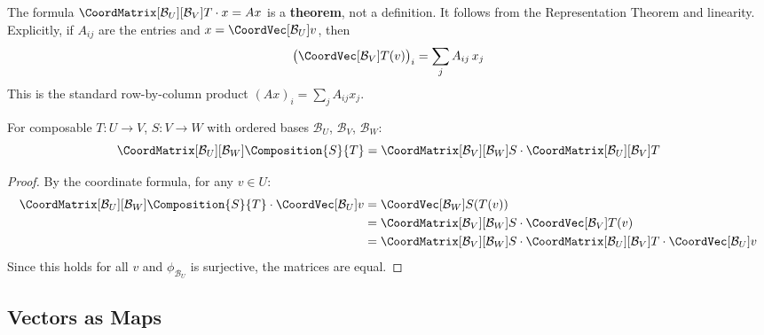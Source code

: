 \begin{remark}
    The formula
    $\CoordMatrix[\mathcal{B}_U][\mathcal{B}_V]{T} \cdot x = Ax$ is a \textbf{theorem},
    not a definition. It follows from the Representation Theorem and linearity.
    Explicitly, if $A_{ij}$ are the entries and $x = \CoordVec[\mathcal{B}_U]{v}$, then
    \[
        \bigl(\CoordVec[\mathcal{B}_V]{T(v)}\bigr)_i = \sum_{j} A_{ij}\, x_j
    \]
    This is the standard row-by-column product $(Ax)_i = \sum_j A_{ij} x_j$.
\end{remark}

\begin{corollary}
\label{thm:comp-mult}
    For composable $T: U \to V$, $S: V \to W$ with ordered bases
    $\mathcal{B}_U$, $\mathcal{B}_V$, $\mathcal{B}_W$:
    \[
        \CoordMatrix[\mathcal{B}_U][\mathcal{B}_W]{\Composition{S}{T}}
        = \CoordMatrix[\mathcal{B}_V][\mathcal{B}_W]{S}
          \cdot \CoordMatrix[\mathcal{B}_U][\mathcal{B}_V]{T}
    \]
\end{corollary}

\begin{proof}
    By the coordinate formula, for any $v \in U$:
    \begin{align*}
        \CoordMatrix[\mathcal{B}_U][\mathcal{B}_W]{\Composition{S}{T}}
        \cdot \CoordVec[\mathcal{B}_U]{v}
        &= \CoordVec[\mathcal{B}_W]{S(T(v))} \\
        &= \CoordMatrix[\mathcal{B}_V][\mathcal{B}_W]{S}
           \cdot \CoordVec[\mathcal{B}_V]{T(v)} \\
        &= \CoordMatrix[\mathcal{B}_V][\mathcal{B}_W]{S}
           \cdot \CoordMatrix[\mathcal{B}_U][\mathcal{B}_V]{T}
           \cdot \CoordVec[\mathcal{B}_U]{v}
    \end{align*}
    Since this holds for all $v$ and $\phi_{\mathcal{B}_U}$ is surjective, the matrices
    are equal.
\end{proof}

\subsection{Vectors as Maps}

